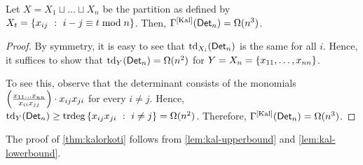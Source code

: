 \begin{lemma}\label{lem:kal-lowerbound}
  Let $X = X_1 \sqcup \dots \sqcup X_n$ be the partition as defined by
  $X_t = \left\{{x_{ij}}\ : \ {i-j\equiv t\bmod{n}}\right\}$. 
Then,
  $\Gamma^{\mathrm{[Kal]}}(\operatorname{\mathsf{Det}}_n) = \Omega(n^3)$.
\end{lemma}
\begin{proof}
  By symmetry, it is easy to see that $\text{td}_{X_i}(\operatorname{\mathsf{Det}}_n)$ is
  the same for all $i$. 
Hence, it suffices to show that
  $\text{td}_{Y}(\operatorname{\mathsf{Det}}_n) = \Omega(n^2)$ for $Y = X_n = \left\{x_{11},\dots, x_{nn}\right\}$. 

  To see this, observe that the determinant consists of the monomials
  $\left(\frac{x_{11}\dots x_{nn}}{x_{ii}x_{jj}}\right)\cdot
  x_{ij}x_{ji}$ for every $i\neq j$. 
Hence, $\text{td}_{Y}(\operatorname{\mathsf{Det}}_n)
  \geq \mathrm{trdeg}\left\{{x_{ij}x_{ji}}\ : \ {i\neq j}\right\} =
  \Omega(n^2)$. 
Therefore, $\Gamma^{\mathrm{[Kal]}}(\operatorname{\mathsf{Det}}_n) =
  \Omega(n^3)$.
\end{proof}

The proof of \autoref{thm:kalorkoti} follows from
\autoref{lem:kal-upperbound} and \autoref{lem:kal-lowerbound}.



